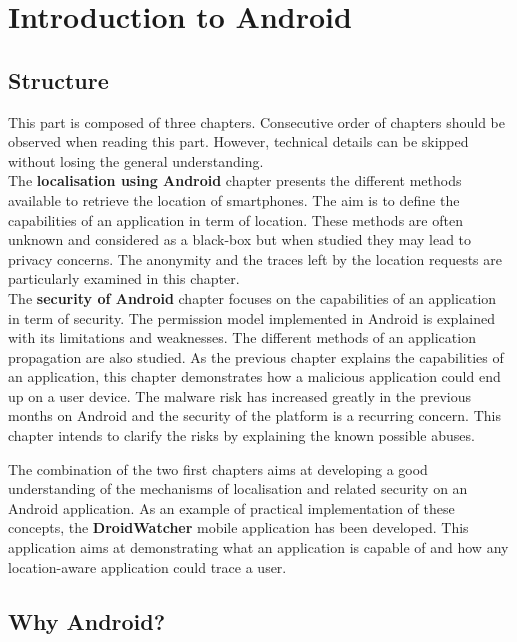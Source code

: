 \chapter{Introduction to Android}
\label{chap:andro-intro}

\section*{Structure}
\label{sec:intro-andro-structure}
This part is composed of three chapters.
Consecutive order of chapters should be observed when reading this part.
However, technical details can be skipped without losing the general understanding.\\

The \textbf{localisation using Android} chapter presents the different methods available to retrieve the location of smartphones.
The aim is to define the capabilities of an application in term of location.
These methods are often unknown and considered as a black-box but when studied they may lead to privacy concerns.
The anonymity and the traces left by the location requests are particularly examined in this chapter.\\

The \textbf{security of Android} chapter focuses on the capabilities of an application in term of security.
The permission model implemented in Android is explained with its limitations and weaknesses.
The different methods of an application propagation are also studied.
As the previous chapter explains the capabilities of an application, this chapter demonstrates how a malicious application could end up on a user device.
The malware risk has increased greatly in the previous months on Android and the security of the platform is a recurring concern.
This chapter intends to clarify the risks by explaining the known possible abuses.

The combination of the two first chapters aims at developing a good understanding of the mechanisms of localisation and related security on an Android application.
As an example of practical implementation of these concepts, the \textbf{DroidWatcher} mobile application has been developed.
This application aims at demonstrating what an application is capable of and how any location-aware application could trace a user.

\section*{Why Android?}
\label{sec:why-android}

